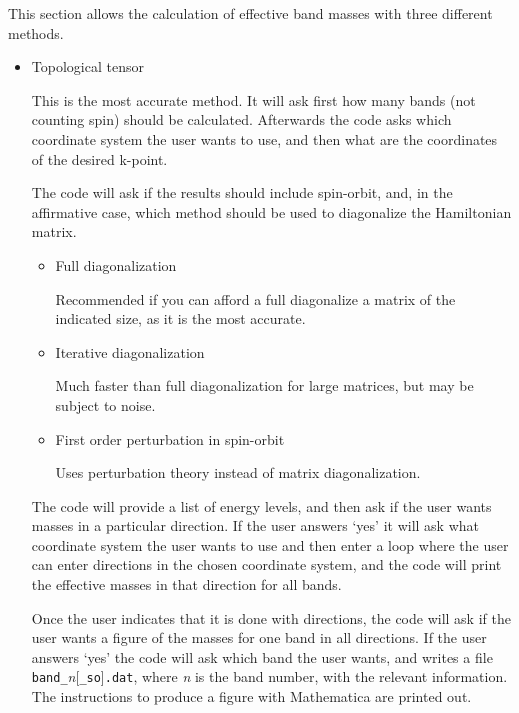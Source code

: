 \documentclass[11pt]{article}
\begin{document}
This section allows the calculation of effective band masses with three different methods.

\begin{itemize}

   \item{Topological tensor}

   This is the most accurate method.
   It will ask first how many bands (not counting spin) should be calculated.
   Afterwards the code asks which coordinate system the user wants to use,
   and then what are the coordinates of the desired k-point.

   The code will ask if the results should include spin-orbit, and, in the
   affirmative case, which method should be used to diagonalize the Hamiltonian matrix.

   \begin{itemize}

      \item{Full diagonalization}

      Recommended if you can afford a full diagonalize a matrix of the indicated size,
      as it is the most accurate.

      \item{Iterative diagonalization}

      Much faster than full diagonalization for large matrices, but may be subject to noise.

      \item{First order perturbation in spin-orbit}

      Uses perturbation theory instead of matrix diagonalization.

   \end{itemize}

   The code will provide a list of energy levels, and then ask if the user wants
   masses in a particular direction.  If the user answers `yes' it will
   ask what coordinate system the user wants to use and then enter a loop
   where the user can enter directions in the chosen coordinate system,
   and the code will print the effective masses in that direction
   for all bands.

   Once the user indicates that it is done with directions,
   the code will ask if the user wants a figure of
   the masses for one band in all directions. If the user answers `yes'
   the code will ask which band the user wants, and writes a file
   \texttt{band\_}{\it n}[\texttt{\_so}]\texttt{.dat}, where {\it n}
   is the band number, with the relevant information.
   The instructions to produce a figure with Mathematica are printed out.



\end{itemize}
\end{document}
